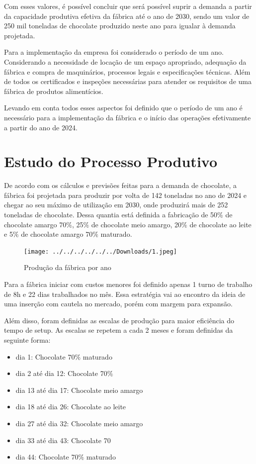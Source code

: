 \documentclass[
	12pt,				%
	openright,			%
	oneside,			%
	a4paper,			%
	english,			%
	french,				%
	spanish,			%
	brazil				%
	]{abntex2}
\begin{document}
Com esses valores, é possível concluir que será possível suprir a demanda a partir da capacidade produtiva efetiva da fábrica até o ano de 2030, sendo um valor de 250 mil toneladas de chocolate produzido neste ano para igualar à demanda projetada.


Para a implementação da empresa foi considerado o período de um ano. Considerando a necessidade de locação de um espaço apropriado, adequação da fábrica e compra de maquinários, processos legais e especificações técnicas. Além de todos os certificados e inspeções necessárias para atender os requisitos de uma fábrica de produtos alimentícios.

Levando em conta todos esses aspectos foi definido que o período de um ano é necessário para a implementação da fábrica e o início das operações efetivamente a partir do ano de 2024.


\newpage
\chapter{Estudo do Processo Produtivo}

De acordo com os cálculos e previsões feitas para a demanda de chocolate, a fábrica foi projetada para produzir por volta de 142 toneladas no ano de 2024 e chegar ao seu máximo de utilização em 2030, onde produzirá mais de 252 toneladas de chocolate. Dessa quantia está definida a fabricação de 50$\%$ de chocolate amargo 70$\%$, 25$\%$ de chocolate meio amargo, 20$\%$ de chocolate ao leite e 5$\%$ de chocolate amargo 70$\%$ maturado.

\begin{figure}[H]
\begin{center}
\caption{Produção da fábrica por ano}
\texttt{[image: ../../../../../../Downloads/1.jpeg]} 
\end{center}
\end{figure}

Para a fábrica iniciar com custos menores foi definido apenas 1 turno de trabalho de 8h e 22 dias trabalhados no mês. Essa estratégia vai ao encontro da ideia de uma inserção com cautela no mercado, porém com margem para expansão.

Além disso, foram definidas as escalas de produção para maior eficiência do tempo de setup. As escalas se repetem a cada 2 meses e foram definidas da seguinte forma:

\begin{itemize}
\item dia 1: Chocolate 70$\%$ maturado
\item dia 2 até dia 12: Chocolate 70$\%$
\item dia 13 até dia 17: Chocolate meio amargo
\item dia 18 até dia 26: Chocolate ao leite
\item dia 27 até dia 32: Chocolate meio amargo
\item dia 33 até dia 43: Chocolate 70%
\item dia 44: Chocolate 70$\%$ maturado
\end{itemize}
\end{document}
